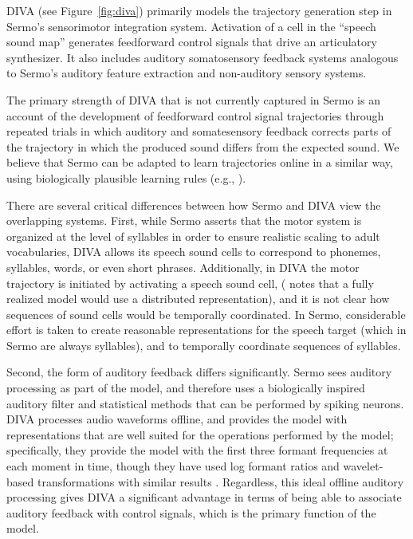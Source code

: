 DIVA (see Figure~\ref{fig:diva}) primarily models
the trajectory generation step
in Sermo's sensorimotor integration system.
Activation of a cell in the ``speech sound map''
generates feedforward control signals
that drive an articulatory synthesizer.
It also includes auditory somatosensory feedback systems
analogous to Sermo's auditory feature extraction
and non-auditory sensory systems.

The primary strength of DIVA
that is not currently captured in Sermo
is an account of the development
of feedforward control signal trajectories
through repeated trials in which
auditory and somatesensory feedback
corrects parts of the trajectory
in which the produced sound differs
from the expected sound.
We believe that Sermo can be adapted
to learn trajectories online in a similar way,
using biologically plausible learning rules
(e.g., \citealt{macneil2011,bekolay2013a}).

There are several critical differences
between how Sermo and DIVA view
the overlapping systems.
First, while Sermo asserts that
the motor system is organized at the level
of syllables in order to ensure
realistic scaling to adult vocabularies,
DIVA allows its speech sound cells to
correspond to phonemes, syllables, words,
or even short phrases.
Additionally, in DIVA
the motor trajectory is initiated
by activating a speech sound cell,
(\citealt{guenther2006a} notes that a fully realized
model would use a distributed representation),
and it is not clear how sequences
of sound cells would be temporally coordinated.
In Sermo, considerable effort is taken
to create reasonable representations
for the speech target
(which in Sermo are always syllables),
and to temporally coordinate
sequences of syllables.

Second, the form of auditory feedback
differs significantly.
Sermo sees auditory processing as part of
the model, and therefore uses
a biologically inspired auditory filter
and statistical methods that can be
performed by spiking neurons.
DIVA processes audio waveforms offline,
and provides the model with
representations that are well suited
for the operations performed by the model;
specifically, they provide the model with
the first three formant frequencies
at each moment in time,
though they have used log formant ratios
and wavelet-based transformations
with similar results \citep{guenther2006a}.
Regardless, this ideal offline auditory processing
gives DIVA a significant advantage
in terms of being able to
associate auditory feedback
with control signals,
which is the primary function of the model.


